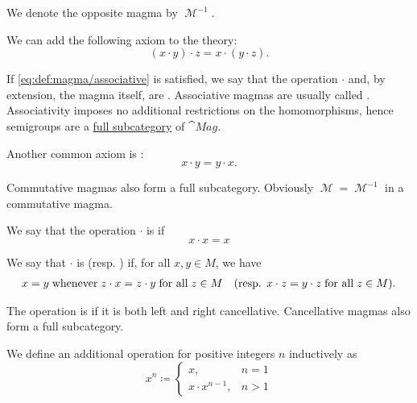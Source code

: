 \begin{definition}
\begin{thmenum}
    We denote the opposite magma by \( \mscrM^{-1} \).

     We can add the following axiom to the theory:
    \begin{equation}\label{eq:def:magma/associative}
      (x \cdot y) \cdot z = x \cdot (y \cdot z).
    \end{equation}

    If \eqref{eq:def:magma/associative} is satisfied, we say that the operation \( \cdot \) and, by extension, the magma itself, are . Associative magmas are usually called . Associativity imposes no additional restrictions on the homomorphisms, hence semigroups are a \hyperref[def:subcategory]{full subcategory} of \( \cat{Mag} \).

     Another common axiom is :
    \begin{equation}\label{eq:def:magma/commutative}
      x \cdot y = y \cdot x.
    \end{equation}

    Commutative magmas also form a full subcategory. Obviously \( \mscrM = \mscrM^{-1} \) in a commutative magma.

     We say that the operation \( \cdot \) is  if
    \begin{equation}\label{eq:def:magma/idempotent}
      x \cdot x = x
    \end{equation}

     We say that \( \cdot \) is  (resp. ) if, for all \( x, y \in M \), we have
    \begin{align}\label{eq:def:magma/cancellative}
      x = y \T{whenever} z \cdot x = z \cdot y \T{for all} z \in M
      &&
      (\text{resp. } x \cdot z = y \cdot z \T{for all} z \in M).
    \end{align}

    The operation is  if it is both left and right cancellative. Cancellative magmas also form a full subcategory.

     We define an additional  operation for positive integers \( n \) inductively as
    \begin{equation}\label{eq:def:magma/exponentiation}
      x^n \coloneqq \begin{cases}
        x,               & n = 1 \\
        x \cdot x^{n-1}, & n > 1
      \end{cases}
    \end{equation}


\end{thmenum}
\end{definition}
